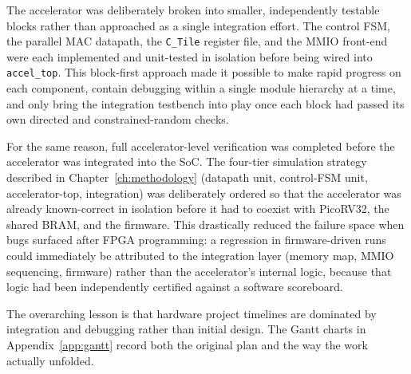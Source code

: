 The accelerator was deliberately broken into smaller, independently
testable blocks rather than approached as a single integration effort.
The control FSM, the parallel MAC datapath, the \texttt{C\_Tile}
register file, and the MMIO front-end were each implemented and
unit-tested in isolation before being wired into \texttt{accel\_top}.
This block-first approach made it possible to make rapid progress on
each component, contain debugging within a single module hierarchy at
a time, and only bring the integration testbench into play once each
block had passed its own directed and constrained-random checks.

For the same reason, full accelerator-level verification was completed
before the accelerator was integrated into the SoC. The four-tier
simulation strategy described in Chapter~\ref{ch:methodology}
(datapath unit, control-FSM unit, accelerator-top, integration) was
deliberately ordered so that the accelerator was already known-correct
in isolation before it had to coexist with PicoRV32, the shared BRAM,
and the firmware. This drastically reduced the failure space when
bugs surfaced after FPGA programming: a regression in firmware-driven
runs could immediately be attributed to the integration layer
(memory map, MMIO sequencing, firmware) rather than the accelerator's
internal logic, because that logic had been independently certified
against a software scoreboard.

The overarching lesson is that hardware project timelines are dominated by
integration and debugging rather than initial design. The Gantt charts in
Appendix~\ref{app:gantt} record both the original plan and the way the work
actually unfolded.
